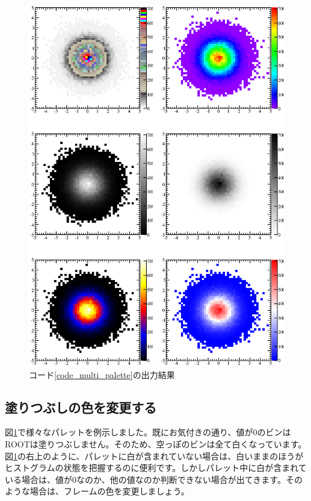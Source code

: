 \begin{NoFloat}

\end{NoFloat}

\begin{figure}
  \begin{center}
    \includegraphics[width=12cm,clip]{fig/multi_palette.eps}
    \caption{コード\ref{code_multi_palette}の出力結果}
    \label{fig_multi_palette_eps}
  \end{center}
\end{figure}

\subsection{塗りつぶしの色を変更する}

図\ref{fig_multi_palette_eps}で様々なパレットを例示しました。既にお気付きの通り、値が0のビンはROOTは塗りつぶしません。そのため、空っぽのビンは全て白くなっています。図\ref{fig_multi_palette_eps}の右上のように、パレットに白が含まれていない場合は、白いままのほうがヒストグラムの状態を把握するのに便利です。しかしパレット中に白が含まれている場合は、値が0なのか、他の値なのか判断できない場合が出てきます。そのような場合は、フレームの色を変更しましょう。

